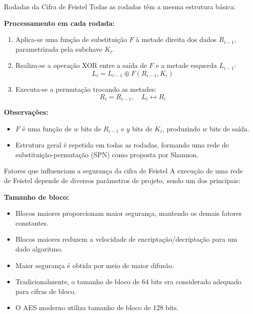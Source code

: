 \begin{frame}{Rodadas da Cifra de Feistel}
    Todas as rodadas têm a mesma estrutura básica:

    \medskip
    \textbf{Processamento em cada rodada:}
    \begin{enumerate}
        \item Aplica-se uma função de substituição $F$ à metade direita dos dados $R_{i-1}$, parametrizada pela subchave $K_i$.
        \item Realiza-se a operação XOR entre a saída de $F$ e a metade esquerda $L_{i-1}$:
              \[
                  L_i = L_{i-1} \oplus F(R_{i-1}, K_i)
              \]
        \item Executa-se a permutação trocando as metades:
              \[
                  R_i = R_{i-1}, \quad L_i \leftrightarrow R_i
              \]
    \end{enumerate}

    \medskip
    \textbf{Observações:}
    \begin{itemize}
        \item $F$ é uma função de $w$ bits de $R_{i-1}$ e $y$ bits de $K_i$, produzindo $w$ bits de saída.
        \item Estrutura geral é repetida em todas as rodadas, formando uma rede de substituição-permutação (SPN) como proposta por Shannon.
    \end{itemize}
\end{frame}

\begin{frame}{Fatores que influenciam a segurança da cifra de Feistel}
    A execução de uma rede de Feistel depende de diversos parâmetros de projeto, sendo um dos principais:

    \medskip
    \textbf{Tamanho de bloco:}
    \begin{itemize}
        \item Blocos maiores proporcionam maior segurança, mantendo os demais fatores constantes.
        \item Blocos maiores reduzem a velocidade de encriptação/decriptação para um dado algoritmo.
        \item Maior segurança é obtida por meio de maior difusão.
        \item Tradicionalmente, o tamanho de bloco de 64 bits era considerado adequado para cifras de bloco.
        \item O AES moderno utiliza tamanho de bloco de 128 bits.
    \end{itemize}
\end{frame}


